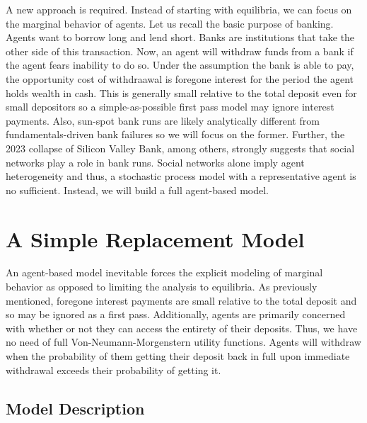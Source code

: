 \documentclass[12pt]{article}
\begin{document}
\begin{doublespace}
A new approach is required. Instead of starting with equilibria, we can focus on
the marginal behavior of agents. Let us recall the basic purpose of banking. 
Agents want to borrow long and lend short. Banks are institutions that take the 
other side of this transaction. Now, an agent will withdraw funds from a bank if 
the agent fears inability to do so. Under the assumption the bank is able to pay,
the opportunity cost of withdraawal is foregone interest for the period the agent
holds wealth in cash. This is generally small relative to the total deposit even
for small depositors so a simple-as-possible first pass model may ignore interest
payments. Also, sun-spot bank runs are likely analytically different from fundamentals-driven
bank failures so we will focus on the former. Further, the 2023 collapse of 
Silicon Valley Bank, among others, strongly suggests that social networks play
a role in bank runs. Social networks alone imply agent heterogeneity and thus,
a stochastic process model with a representative agent is no sufficient. 
Instead, we will build a full agent-based model. 



\section{A Simple Replacement Model}
An agent-based model inevitable forces the explicit modeling of marginal behavior
as opposed to limiting the analysis to equilibria. As previously mentioned, 
foregone interest payments are small relative to the total deposit and so may
be ignored as a first pass. Additionally, agents are primarily concerned with 
whether or not they can access the entirety of their deposits. Thus, we have no 
need of full Von-Neumann-Morgenstern utility functions. Agents will withdraw 
when the probability of them getting their deposit back in full upon immediate 
withdrawal exceeds their probability of getting it.
\subsection{Model Description}


\end{doublespace}
\end{document}
